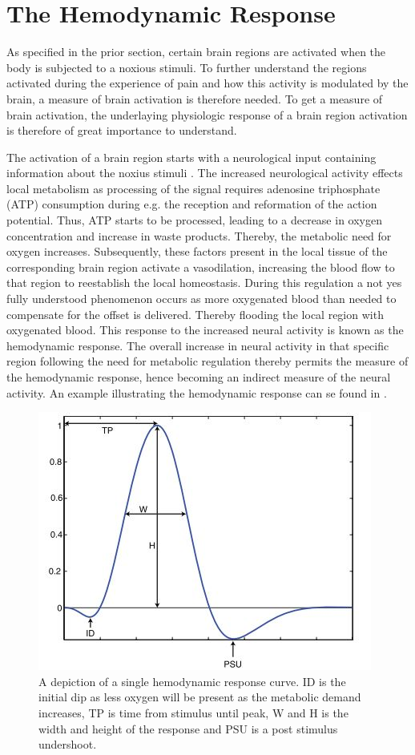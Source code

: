 
\section{The Hemodynamic Response}

As specified in the prior section, certain brain regions are activated when the body is subjected to a noxious stimuli. To further understand the regions activated during the experience of pain and how this activity is modulated by the brain, a measure of brain activation is therefore needed. To get a measure of brain activation, the underlaying physiologic response of a brain region activation is therefore of great importance to understand. 

The activation of a brain region starts with a neurological input containing information about the noxius stimuli \cite{Tracey2007}. The increased neurological activity effects local metabolism as processing of the signal requires adenosine triphosphate (ATP) consumption during e.g. the reception and reformation of the action potential. Thus, ATP starts to be processed, leading to a decrease in oxygen concentration and increase in waste products. Thereby, the metabolic need for oxygen increases. Subsequently, these factors present in the local tissue of the corresponding brain region activate a vasodilation, increasing the blood flow to that region to reestablish the local homeostasis. During this regulation a not yes fully understood phenomenon occurs as more oxygenated blood than needed to compensate for the offset is delivered. Thereby flooding the local region with oxygenated blood. This response to the increased neural activity is known as the hemodynamic response. The overall increase in neural activity in that specific region following the need for metabolic regulation thereby permits the measure of the hemodynamic response, hence becoming an indirect measure of the neural activity. An example illustrating the hemodynamic response can se found in . \cite{Glover2011,Poldrack2011}

\begin{figure}[H]                 
	\includegraphics[width=.48\textwidth]{figures/aBackground/HRF}  
	\caption{A depiction of a single hemodynamic response curve. ID is the initial dip as less oxygen will be present as the metabolic demand increases, TP is time from stimulus until peak, W and H is the width and height of the response and PSU is a post stimulus undershoot. \cite{Poldrack2011}}
	\label{fig:back:HRF} 
\end{figure}

